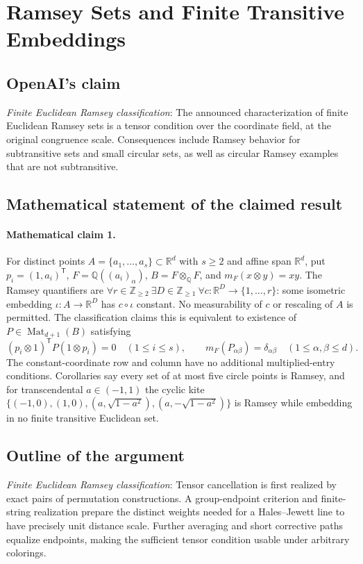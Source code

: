 \documentclass[11pt]{article}
\begin{document}
\section*{Ramsey Sets and Finite Transitive Embeddings}

\subsection{OpenAI's claim}
\textit{Finite Euclidean Ramsey classification}: The announced characterization of finite Euclidean Ramsey sets is a tensor condition over the coordinate field, at the original congruence scale. Consequences include Ramsey behavior for subtransitive sets and small circular sets, as well as circular Ramsey examples that are not subtransitive.

\subsection{Mathematical statement of the claimed result}
\paragraph{Mathematical claim 1.} For distinct points $A=\{a_1,\ldots,a_s\}\subset\mathbb R^d$ with $s\ge2$ and affine span $\mathbb R^d$, put $p_i=(1,a_i)^{\mathsf T}$, $F=\mathbb Q((a_i)_\alpha)$, $B=F\otimes_{\mathbb Q}F$, and $m_F(x\otimes y)=xy$. The Ramsey quantifiers are $\forall r\in\mathbb Z_{\ge2}\ \exists D\in\mathbb Z_{\ge1}\ \forall c:\mathbb R^D\to\{1,\ldots,r\}$: some isometric embedding $\iota:A\to\mathbb R^D$ has $c\circ\iota$ constant. No measurability of $c$ or rescaling of $A$ is permitted. The classification claims this is equivalent to existence of $P\in\operatorname{Mat}_{d+1}(B)$ satisfying \[(p_i\otimes1)^{\mathsf T}P(1\otimes p_i)=0\quad(1\le i\le s),\qquad m_F(P_{\alpha\beta})=\delta_{\alpha\beta}\quad(1\le\alpha,\beta\le d).\] The constant-coordinate row and column have no additional multiplied-entry conditions. Corollaries say every set of at most five circle points is Ramsey, and for transcendental $a\in(-1,1)$ the cyclic kite $\{(-1,0),(1,0),(a,\sqrt{1-a^2}),(a,-\sqrt{1-a^2})\}$ is Ramsey while embedding in no finite transitive Euclidean set.

\subsection{Outline of the argument}
\textit{Finite Euclidean Ramsey classification}: Tensor cancellation is first realized by exact pairs of permutation constructions. A group-endpoint criterion and finite-string realization prepare the distinct weights needed for a Hales--Jewett line to have precisely unit distance scale. Further averaging and short corrective paths equalize endpoints, making the sufficient tensor condition usable under arbitrary colorings.
\end{document}
